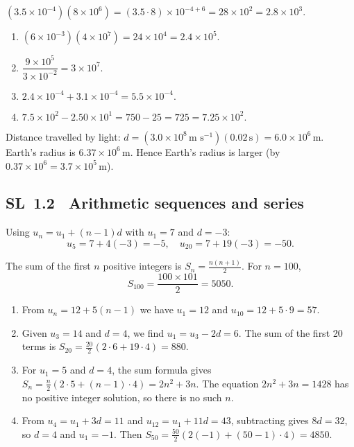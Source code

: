\documentclass[11pt]{article}
\newcommand{\tocsubsection}[1]{\subsection{#1}}
\begin{document}
\begin{solution}
\((3.5\times10^{-4})(8\times10^{6}) = (3.5\cdot 8)\times 10^{-4+6} = 28\times 10^{2} = 2.8\times 10^{3}.\)
\end{solution}


\begin{solution}
\begin{enumerate}[label=(\alph*)]
\item \((6\times10^{-3})(4\times10^{7}) = 24\times 10^{4} = 2.4\times 10^{5}.\)
\item \(\dfrac{9\times10^{5}}{3\times10^{-2}} = 3\times 10^{7}.\)
\item \(2.4\times10^{-4} + 3.1\times10^{-4} = 5.5\times10^{-4}.\)
\item \(7.5\times10^{2} - 2.50\times10^{1} = 750 - 25 = 725 = 7.25\times10^{2}.\)
\end{enumerate}
\end{solution}


\begin{solution}
Distance travelled by light: \(d = (3.0\times10^{8}\,\text{m s}^{-1})(0.02\,\text{s}) = 6.0\times10^{6}\,\text{m}\).
Earth's radius is \(6.37\times10^{6}\,\text{m}\). Hence Earth's radius is larger (by \(0.37\times10^{6} = 3.7\times10^{5}\,\text{m}\)).
\end{solution}

\tocsubsection{SL 1.2 \; Arithmetic sequences and series}

\begin{solution}
Using $u_n = u_1 + (n-1)d$ with $u_1=7$ and $d=-3$:
\[
u_5 = 7 + 4(-3) = -5,\quad 
u_{20} = 7 + 19(-3) = -50.
\]
\end{solution}

\begin{solution}
The sum of the first $n$ positive integers is $S_n = \frac{n(n+1)}{2}$. For $n=100$,
\[
S_{100} = \frac{100\times 101}{2} = 5050.
\]
\end{solution}


\begin{solution}
\begin{enumerate}[label=(\alph*)]
\item From $u_n = 12 + 5(n-1)$ we have $u_1 = 12$ and $u_{10} = 12 + 5\cdot 9 = 57$.
\item Given $u_3 = 14$ and $d = 4$, we find $u_1 = u_3 - 2d = 6$.  The sum of the first 20 terms is $S_{20} = \frac{20}{2}(2\cdot 6 + 19\cdot 4) = 880$.
\item For $u_1=5$ and $d=4$, the sum formula gives $S_n = \frac{n}{2}(2\cdot 5 + (n-1)\cdot 4) = 2n^2 + 3n$.  The equation $2n^2+3n=1428$ has no positive integer solution, so there is no such $n$.
\item From $u_4 = u_1 + 3d = 11$ and $u_{12} = u_1 + 11d = 43$, subtracting gives $8d=32$, so $d=4$ and $u_1 = -1$.  Then $S_{50} = \frac{50}{2}(2(-1)+(50-1)\cdot 4) = 4850$.
\end{enumerate}
\end{solution}
\end{document}
